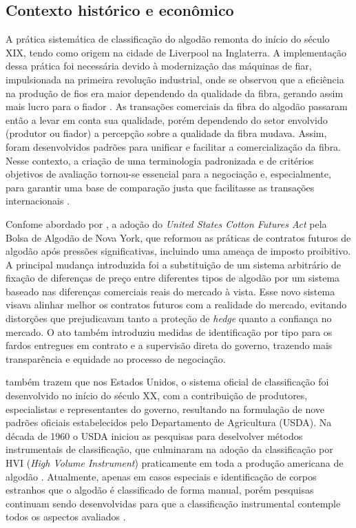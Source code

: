 \subsection{Contexto histórico e econômico}

A prática sistemática de classificação do algodão remonta do início do século XIX, tendo como origem na cidade de
Liverpool na Inglaterra. A implementação dessa prática foi necessária devido à modernização das máquinas de fiar,
impulsionada na primeira revolução industrial, onde se observou que 
a eficiência na produção de fios era maior dependendo da qualidade da fibra, gerando assim mais lucro para o fiador
\cite{morais2021interpretacao}. As transações comerciais da fibra do algodão passaram então a levar em conta sua
qualidade, porém dependendo do setor envolvido (produtor ou fiador) a percepção sobre a qualidade
da fibra mudava. Assim, foram desenvolvidos padrões para unificar e facilitar a comercialização da fibra. 
Nesse contexto, a criação de uma terminologia padronizada e de critérios objetivos de avaliação 
tornou-se essencial para a negociação e, especialmente, para garantir uma base de comparação justa que facilitasse 
as transações internacionais \cite{earle1914classification}.

Confome abordado por , a adoção do \textit{United States Cotton Futures Act} pela Bolsa de Algodão de Nova York, que reformou as práticas de contratos futuros de algodão após pressões significativas, incluindo uma  ameaça de imposto proibitivo. A principal mudança introduzida foi a substituição de um sistema arbitrário de fixação de diferenças de preço entre diferentes tipos de algodão por um sistema baseado nas diferenças comerciais reais do mercado à vista. Esse novo sistema visava alinhar melhor os contratos futuros com a realidade do mercado, evitando distorções que prejudicavam tanto a proteção de \textit{hedge} quanto a confiança no mercado. O ato também introduziu medidas de identificação por tipo para os fardos entregues em contrato e a supervisão direta do governo, trazendo mais transparência e equidade ao processo de negociação.

 também trazem que nos Estados Unidos, o sistema oficial de classificação foi desenvolvido no início do século XX, com a contribuição de produtores, especialistas e representantes do governo, resultando na formulação de nove padrões oficiais estabelecidos pelo Departamento de Agricultura (USDA). Na década de 1960 o USDA iniciou as pesquisas para deselvolver métodos instrumentais de classificação, que culminaram na adoção da classificação por HVI (\textit{High Volume Instrument}) praticamente em toda a produção americana de algodão \cite{knowlton2005usda}. Atualmente, apenas em casos especiais e identificação de corpos estranhos que o algodão é classificado de forma manual, porém pesquisas continuam sendo desenvolvidas para que a classificação instrumental contemple todos os aspectos avaliados \cite{cottoninc2020classification}.

